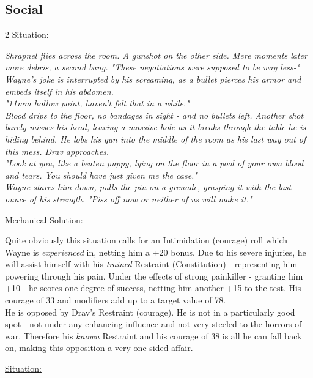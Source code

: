 \pagebreak
\subsection*{Social}
\vspace{4mm}
\begin{multicols}{2}
	\ul{Situation:}
	\begin{exampleblock}
		\itshape
		Shrapnel flies across the room.
		A gunshot on the other side.
		Mere moments later more debris, a second bang.
		"These negotiations were supposed to be way less-"
		\\%
		Wayne's joke is interrupted by his screaming,
			as a bullet pierces his armor and embeds itself in his abdomen.
		\\%
		"11mm hollow point, haven't felt that in a while."
		\\%
		Blood drips to the floor, no bandages in sight - and no bullets left.
		Another shot barely misses his head,
			leaving a massive hole as it breaks through the table he is hiding behind.
		He lobs his gun into the middle of the room as his last way out of this mess.
		Drav approaches.
		\\%
		"Look at you, like a beaten puppy, lying on the floor in a pool of your own blood and tears.
		You should have just given me the case."
		\\%
		Wayne stares him down, pulls the pin on a grenade,
			grasping it with the last ounce of his strength.
		"Piss off now or neither of us will make it."
	\end{exampleblock}
	\columnbreak
	\ul{Mechanical Solution:}
	\begin{exampleblock}
		Quite obviously this situation calls for an Intimidation (courage) roll which Wayne is \emph{experienced} in, netting him a +20 bonus. Due to his severe injuries, he will assist himself with his \emph{trained} Restraint (Constitution) - representing him powering through his pain. Under the effects of strong painkiller - granting him +10 - he scores one degree of success, netting him another +15 to the test. His courage of 33 and modifiers add up to a target value of 78.\\
		He is opposed by Drav's Restraint (courage). He is not in a particularly good spot - not under any enhancing influence and not very steeled to the horrors of war. Therefore his \emph{known} Restraint and his courage of 38 is all he can fall back on, making this opposition a very one-sided affair.
	\end{exampleblock}
	\columnbreak
	\ul{Situation:}

\end{multicols}
